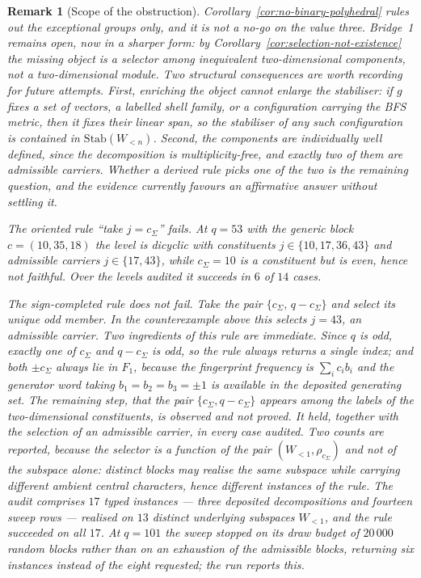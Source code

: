 \documentclass[11pt,a4paper]{article}
\newtheorem{remark}[theorem]{Remark}
\begin{document}
    \begin{remark}[Scope of the obstruction]
      \label{rem:o12-scope}
      Corollary~\ref{cor:no-binary-polyhedral} rules out the exceptional groups only, and it is
      not a no-go on the value three.
      Bridge~1 remains open, now in a sharper form: by
      Corollary~\ref{cor:selection-not-existence} the missing object is a selector among
      inequivalent two-dimensional components, not a two-dimensional module.
      Two structural consequences are worth recording for future attempts.
      First, enriching the object cannot enlarge the stabiliser: if $g$ fixes a set of vectors,
      a labelled shell family, or a configuration carrying the BFS metric, then it fixes their
      linear span, so the stabiliser of any such configuration is contained in
      $\mathrm{Stab}(W_{<n})$.
      Second, the components are individually well defined, since the decomposition is
      multiplicity-free, and exactly two of them are admissible carriers.
      Whether a derived rule picks one of the two is the remaining question, and the evidence
      currently favours an affirmative answer without settling it.

      The oriented rule ``take $j = c_{\Sigma}$'' fails.
      At $q = 53$ with the generic block $c = (10, 35, 18)$ the level is dicyclic with
      constituents $j \in \{10, 17, 36, 43\}$ and admissible carriers $j \in \{17, 43\}$,
      while $c_{\Sigma} = 10$ is a constituent but is even, hence not faithful.
      Over the levels audited it succeeds in $6$ of $14$ cases.

      The sign-completed rule does not fail.
      Take the pair $\{c_{\Sigma},\, q - c_{\Sigma}\}$ and select its unique odd member.
      In the counterexample above this selects $j = 43$, an admissible carrier.
      Two ingredients of this rule are immediate.
      Since $q$ is odd, exactly one of $c_{\Sigma}$ and $q - c_{\Sigma}$ is odd, so the rule
      always returns a single index; and both $\pm c_{\Sigma}$ always lie in $F_{1}$, because
      the fingerprint frequency is $\sum_{i} c_{i} b_{i}$ and the generator word taking
      $b_{1} = b_{2} = b_{3} = \pm 1$ is available in the deposited generating set.
      The remaining step, that the pair $\{c_{\Sigma}, q - c_{\Sigma}\}$ appears among the
      labels of the two-dimensional constituents, is observed and not proved.
      It held, together with the selection of an admissible carrier, in every case audited.
      Two counts are reported, because the selector is a function of the pair
      $(W_{<1}, \rho_{c_{\Sigma}})$ and not of the subspace alone: distinct blocks may realise
      the same subspace while carrying different ambient central characters, hence different
      instances of the rule.
      The audit comprises $17$ typed instances --- three deposited decompositions and fourteen
      sweep rows --- realised on $13$ distinct underlying subspaces $W_{<1}$, and the rule
      succeeded on all $17$.
      At $q = 101$ the sweep stopped on its draw budget of $20\,000$ random blocks rather than
      on an exhaustion of the admissible blocks, returning six instances instead of the eight
      requested; the run reports this.


\end{remark}
\end{document}
